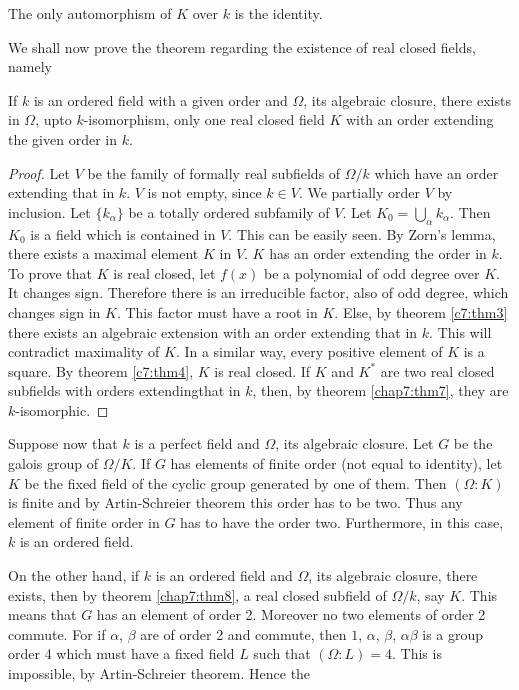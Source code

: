 \begin{coro*}
The only automorphism of $K$ over $k$ is the identity.
\end{coro*}

We shall now prove the theorem regarding the existence of real closed
fields, namely

\begin{thm}\label{chap7:thm8}%
If $k$ is an ordered field with a given order and $\Omega$, its
algebraic closure, there exists in $\Omega$, upto $k$-isomorphism,
only one real closed field $K$ with an order extending the given order
in $k$.
\end{thm}

\begin{proof}
Let $V$ be the family of formally real subfields of $\Omega/k$ which
have an order extending that in $k$. $V$ is not empty, since $k\in
V$. We partially order $V$ by inclusion. Let $\{k_{\alpha}\}$ be a
totally ordered subfamily of $V$. Let
$K_0=\bigcup\limits_{\alpha} k_{\alpha}$. Then $K_0$ is a field which is
contained in $V$. This can be easily seen. By Zorn's lemma, there
exists a maximal element $K$ in $V$. $K$ has an order extending the
order in $k$. To prove that $K$ is real closed, let $f(x)$ be a
polynomial of odd degree over $K$. It changes sign. Therefore there is
an irreducible factor, also of odd degree, which changes sign in
$K$. This factor must have a root in $K$. Else, by theorem
\ref{c7:thm3} there 
exists an algebraic extension with an order extending that in
$k$. This will contradict maximality of $K$. In a similar way, every
positive element of $K$ is a square. By theorem \ref{c7:thm4}, $K$ is real
closed. If $K$ and $K^{\ast}$ are two real closed subfields with
orders extending\pageoriginale that in $k$, then, by theorem
\ref{chap7:thm7}, they are $k$-isomorphic. 
\end{proof}

 Suppose now that $k$ is a perfect field and $ \Omega $, its algebraic
 closure. Let $G$ be the galois group of $ \Omega /K $. If $G$ has
 elements of finite  order (not equal to identity), let $K$ be the
 fixed field of the cyclic group generated by one of them. Then $(
 \Omega : K )$ is finite and by Artin-Schreier theorem this order has
 to be two. Thus any element of finite order in $ G $ has to have the
 order two. Furthermore, in this case, $k$ is an ordered field. 
 
 On the other hand, if $k$ is an ordered field and $ \Omega $, its
 algebraic closure, there exists, then by theorem \ref{chap7:thm8}, a
 real closed 
 subfield of $ \Omega /k $, say $K$. This means that $G$ has an
 element of order 2. Moreover no two elements of order 2
 commute. For if $ \alpha$, $\beta $ are of order 2 and  commute, then
 $1$, $\alpha$, $\beta$, $\alpha \beta $ is a group order  4 which must
 have a fixed field $L$ such that $ ( \Omega : L ) = 4 $. This is
 impossible, by Artin-Schreier theorem. Hence the  

